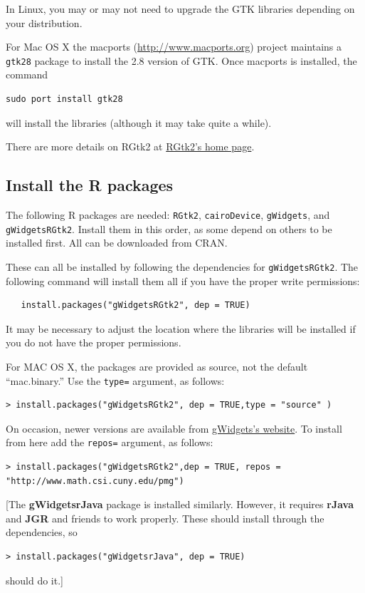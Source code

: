 \documentclass[12pt]{article}
\newcommand{\RCode}[1]{\texttt{#1}}
\newcommand{\RPackage}[1]{\textbf{#1}}
\begin{document}
In Linux, you may or may not need to upgrade the GTK libraries
depending on your distribution.

For Mac OS X the macports (\url{http://www.macports.org}) project
maintains a \texttt{gtk28} package to install the 2.8 version of
GTK. Once macports is installed, the command
\begin{verbatim}
sudo port install gtk28
\end{verbatim}
will install the libraries (although it may take quite a while).


There are more details on RGtk2 at 
\href{http://www.ggobi.org/rgtk2}{RGtk2's home page}.


\subsection{Install the R packages}

The following R packages are needed: \texttt{RGtk2},
\texttt{cairoDevice}, \texttt{gWidgets}, and
\texttt{gWidgetsRGtk2}. Install them in this order, as some depend on
others to be installed first. All can be downloaded from CRAN.

These can all be installed by following the dependencies for
\RCode{gWidgetsRGtk2}. The following command will install them all if
you have the proper write permissions:

\begin{verbatim}
   install.packages("gWidgetsRGtk2", dep = TRUE)
\end{verbatim}

It may be necessary  to adjust the location where the libraries will be
installed if you do not have the proper permissions.

For MAC OS X, the packages are provided as source, not the default
``mac.binary.'' Use the \RCode{type=} argument, as follows:
\begin{verbatim}
> install.packages("gWidgetsRGtk2", dep = TRUE,type = "source" )
\end{verbatim}

On occasion, newer versions are available from
\href{http://www.math.csi.cuny.edu/pmg}{gWidgets's website}. To
install from here add the \texttt{repos=} argument, as follows:

\begin{verbatim}
> install.packages("gWidgetsRGtk2",dep = TRUE, repos = "http://www.math.csi.cuny.edu/pmg")
\end{verbatim}


[The \RPackage{gWidgetsrJava} package is installed similarly. However,
it requires \RPackage{rJava} and \RPackage{JGR} and friends to work
properly. These should install through the dependencies, so
\begin{verbatim}
> install.packages("gWidgetsrJava", dep = TRUE)
\end{verbatim}
should do it.]
\end{document}
